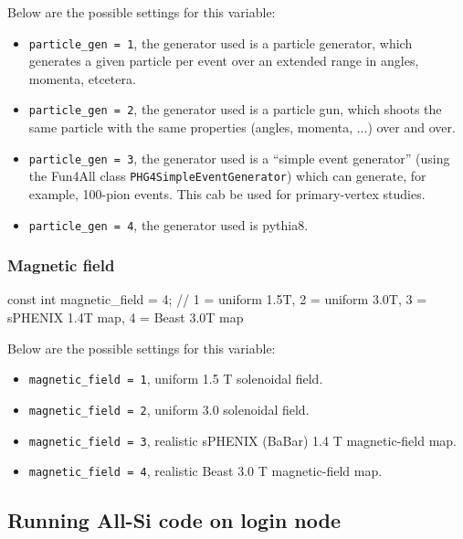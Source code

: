 \documentclass[12pt]{article}
\begin{document}
Below are the possible settings for this variable:

\begin{itemize}
\item \verb|particle_gen = 1|, the generator used is a particle generator, which generates a given particle per event over an extended range in angles, momenta, etcetera.
\item \verb|particle_gen = 2|, the generator used is a particle gun, which shoots the same particle with the same properties (angles, momenta, ...) over and over. 
\item \verb|particle_gen = 3|, the generator used is a ``simple event generator'' (using the Fun4All class \verb|PHG4SimpleEventGenerator|) which can generate, for example, 100-pion events.
This cab be used for primary-vertex studies.
\item \verb|particle_gen = 4|, the generator used is pythia8.
\end{itemize}

\subsubsection{Magnetic field}

\begin{tcolorbox}
\begin{verbnobox}[\scriptsize]
const int magnetic_field = 4;   // 1 = uniform 1.5T, 2 = uniform 3.0T, 3 = sPHENIX 1.4T map, 4 = Beast 3.0T map
\end{verbnobox}
\end{tcolorbox}

Below are the possible settings for this variable:

\begin{itemize}
\item \verb|magnetic_field = 1|, uniform 1.5 T solenoidal field.
\item \verb|magnetic_field = 2|, uniform 3.0 solenoidal field.
\item \verb|magnetic_field = 3|, realistic sPHENIX (BaBar) 1.4 T magnetic-field map.
\item \verb|magnetic_field = 4|, realistic Beast 3.0 T magnetic-field map.
\end{itemize}


\subsection{Running All-Si code on login node}
\end{document}
